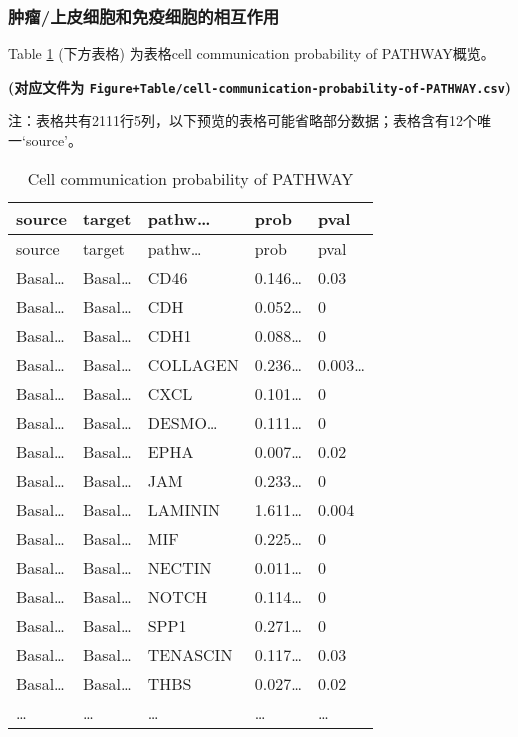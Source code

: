 \documentclass[
]{article}
\begin{document}
\hypertarget{ux80bfux7624ux4e0aux76aeux7ec6ux80deux548cux514dux75abux7ec6ux80deux7684ux76f8ux4e92ux4f5cux7528}{%
\subsubsection{肿瘤/上皮细胞和免疫细胞的相互作用}\label{ux80bfux7624ux4e0aux76aeux7ec6ux80deux548cux514dux75abux7ec6ux80deux7684ux76f8ux4e92ux4f5cux7528}}

Table \ref{tab:cell-communication-probability-of-PATHWAY} (下方表格) 为表格cell communication probability of PATHWAY概览。

\textbf{(对应文件为 \texttt{Figure+Table/cell-communication-probability-of-PATHWAY.csv})}

\begin{center}\begin{tcolorbox}[colback=gray!10, colframe=gray!50, width=0.9\linewidth, arc=1mm, boxrule=0.5pt]注：表格共有2111行5列，以下预览的表格可能省略部分数据；表格含有12个唯一`source'。
\end{tcolorbox}
\end{center}

\begin{longtable}[]{@{}lllll@{}}
\caption{\label{tab:cell-communication-probability-of-PATHWAY}Cell communication probability of PATHWAY}\tabularnewline
\toprule
source & target & pathw\ldots{} & prob & pval\tabularnewline
\midrule
\endfirsthead
\toprule
source & target & pathw\ldots{} & prob & pval\tabularnewline
\midrule
\endhead
Basal\ldots{} & Basal\ldots{} & CD46 & 0.146\ldots{} & 0.03\tabularnewline
Basal\ldots{} & Basal\ldots{} & CDH & 0.052\ldots{} & 0\tabularnewline
Basal\ldots{} & Basal\ldots{} & CDH1 & 0.088\ldots{} & 0\tabularnewline
Basal\ldots{} & Basal\ldots{} & COLLAGEN & 0.236\ldots{} & 0.003\ldots{}\tabularnewline
Basal\ldots{} & Basal\ldots{} & CXCL & 0.101\ldots{} & 0\tabularnewline
Basal\ldots{} & Basal\ldots{} & DESMO\ldots{} & 0.111\ldots{} & 0\tabularnewline
Basal\ldots{} & Basal\ldots{} & EPHA & 0.007\ldots{} & 0.02\tabularnewline
Basal\ldots{} & Basal\ldots{} & JAM & 0.233\ldots{} & 0\tabularnewline
Basal\ldots{} & Basal\ldots{} & LAMININ & 1.611\ldots{} & 0.004\tabularnewline
Basal\ldots{} & Basal\ldots{} & MIF & 0.225\ldots{} & 0\tabularnewline
Basal\ldots{} & Basal\ldots{} & NECTIN & 0.011\ldots{} & 0\tabularnewline
Basal\ldots{} & Basal\ldots{} & NOTCH & 0.114\ldots{} & 0\tabularnewline
Basal\ldots{} & Basal\ldots{} & SPP1 & 0.271\ldots{} & 0\tabularnewline
Basal\ldots{} & Basal\ldots{} & TENASCIN & 0.117\ldots{} & 0.03\tabularnewline
Basal\ldots{} & Basal\ldots{} & THBS & 0.027\ldots{} & 0.02\tabularnewline
\ldots{} & \ldots{} & \ldots{} & \ldots{} & \ldots{}\tabularnewline
\bottomrule
\end{longtable}
\end{document}
